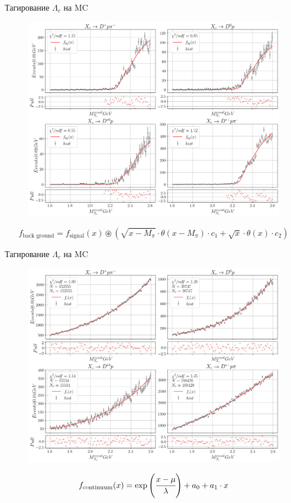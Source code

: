 \documentclass{beamer}
\newcommand{\inner}[1]{\left( #1 \right)}
\begin{document}
\begin{frame}{Тагирование $\Lambda_c$ на MC}
    \begin{figure}[H]
        \centering
        \includegraphics[width=0.74\linewidth]{img/MC_sqr_bg_fit.png}
    \end{figure}
    \begin{equation*}
        f_{\text{back ground}} = f_{\text{signal}}(x) \circledast \inner{\sqrt{x-M_\pi}\cdot\theta\inner{x-M_\pi}\cdot c_1 + \sqrt{x}\cdot\theta\inner{x}\cdot c_2}
    \end{equation*}
\end{frame}

\begin{frame}{Тагирование $\Lambda_c$ на MC}
    \begin{figure}[H]
        \centering
        \includegraphics[width=0.73\linewidth]{img/MC_comb_fit.png}
    \end{figure}
    \begin{equation*}
        f_{\text{continuum}}(x) = \exp\inner{\cfrac{x-\mu}{\lambda}} + a_0 + a_1 \cdot x
    \end{equation*}
\end{frame}
\end{document}
